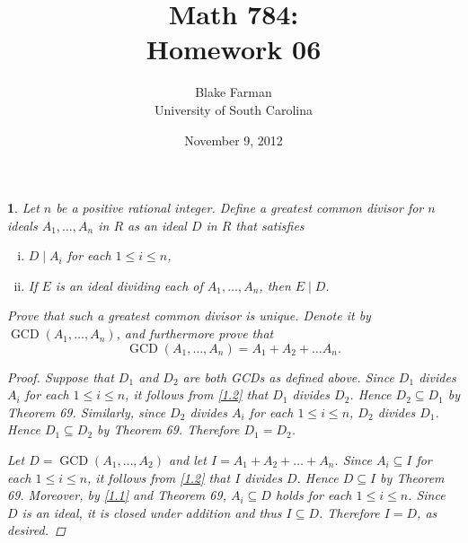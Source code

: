 \documentclass[10pt]{amsart}
\author{Blake Farman\\University of South Carolina}
\title{Math 784:\\Homework 06}
\date{November 9, 2012}
\newcommand{\GCD}[1]{\operatorname{GCD}\left( #1 \right)}
\begin{document}
\maketitle

\newtheorem{thm}{}

\begin{thm}
	Let $n$ be a positive rational integer.
	Define a greatest common divisor for $n$ ideals $A_1, \ldots, A_n$ in $R$ as an ideal $D$ in $R$ that satisfies
	\begin{enumerate}[(i)]
		\item\label{1.1}
			$D \mid A_i$ for each $1 \leq i \leq n$,
		\item\label{1.2}
			If $E$ is an ideal dividing each of $A_1, \ldots, A_n$, then $E \mid D$.
	\end{enumerate}
	Prove that such a greatest common divisor is unique.
	Denote it by $\GCD{A_1, \ldots, A_n}$, and furthermore prove that
		$$\GCD{A_1, \ldots, A_n} = A_1 + A_2 + \ldots A_n.$$
	\begin{proof}
	Suppose that $D_1$ and $D_2$ are both GCDs as defined above.
	Since $D_1$ divides $A_i$ for each $1 \leq i \leq n$, it follows from \eqref{1.2} that $D_1$ divides $D_2$.
	Hence $D_2 \subseteq D_1$ by Theorem 69.
	Similarly, since $D_2$ divides $A_i$ for each $1 \leq i \leq n$, $D_2$ divides $D_1$.
	Hence $D_1 \subseteq D_2$ by Theorem 69.
	Therefore $D_1 = D_2$.
	
	Let $D = \GCD{A_1, \ldots, A_2}$ and let $I = A_1 + A_2 + \ldots + A_n$.
	Since $A_i \subseteq I$ for each $1 \leq i \leq n$, it follows from \eqref{1.2} that $I$ divides $D$.
	Hence $D \subseteq I$ by Theorem 69.
	Moreover, by \eqref{1.1} and Theorem 69, $A_i \subseteq D$ holds for each $1 \leq i \leq n$.
	Since $D$ is an ideal, it is closed under addition and thus $I \subseteq D$.
	Therefore $I = D$, as desired.
	\end{proof}
\end{thm}
\end{document}
